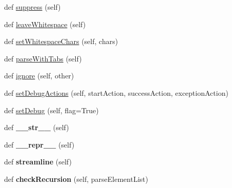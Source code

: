 \begin{DoxyCompactItemize}
def \hyperlink{classpkg__resources_1_1__vendor_1_1pyparsing_1_1_parser_element_a97cc767ada83556a906a749714ccb9a7}{suppress} (self)
\item 
def \hyperlink{classpkg__resources_1_1__vendor_1_1pyparsing_1_1_parser_element_a8e5f94959acd269bf7ac67458755913a}{leave\+Whitespace} (self)
\item 
def \hyperlink{classpkg__resources_1_1__vendor_1_1pyparsing_1_1_parser_element_af541c731255fb5cc4e407841848e0bc5}{set\+Whitespace\+Chars} (self, chars)
\item 
def \hyperlink{classpkg__resources_1_1__vendor_1_1pyparsing_1_1_parser_element_a7216c068aabd74018dc9d34c07099d71}{parse\+With\+Tabs} (self)
\item 
def \hyperlink{classpkg__resources_1_1__vendor_1_1pyparsing_1_1_parser_element_ac2708a9557b2c3724ceb052e45ef8903}{ignore} (self, other)
\item 
def \hyperlink{classpkg__resources_1_1__vendor_1_1pyparsing_1_1_parser_element_ab5d54e826cc3f133346a2aed5f77a1dc}{set\+Debug\+Actions} (self, start\+Action, success\+Action, exception\+Action)
\item 
def \hyperlink{classpkg__resources_1_1__vendor_1_1pyparsing_1_1_parser_element_a40898433962bb7ed5fb13e32e924bd0e}{set\+Debug} (self, flag=True)
\item 
\mbox{\label{classpkg__resources_1_1__vendor_1_1pyparsing_1_1_parser_element_ac4e73fc2fe57caa6ddc496d7a7e34a3a}} 
def {\bfseries \+\_\+\+\_\+str\+\_\+\+\_\+} (self)
\item 
\mbox{\label{classpkg__resources_1_1__vendor_1_1pyparsing_1_1_parser_element_a3958ca1e477f610c2f3a7f409a907961}} 
def {\bfseries \+\_\+\+\_\+repr\+\_\+\+\_\+} (self)
\item 
\mbox{\label{classpkg__resources_1_1__vendor_1_1pyparsing_1_1_parser_element_adf958ac597bae4beb3a1c91a638f807f}} 
def {\bfseries streamline} (self)
\item 
\mbox{\label{classpkg__resources_1_1__vendor_1_1pyparsing_1_1_parser_element_a8c96b900eab7bdbc4d996ab9b7d16069}} 
def {\bfseries check\+Recursion} (self, parse\+Element\+List)

\end{DoxyCompactItemize}
